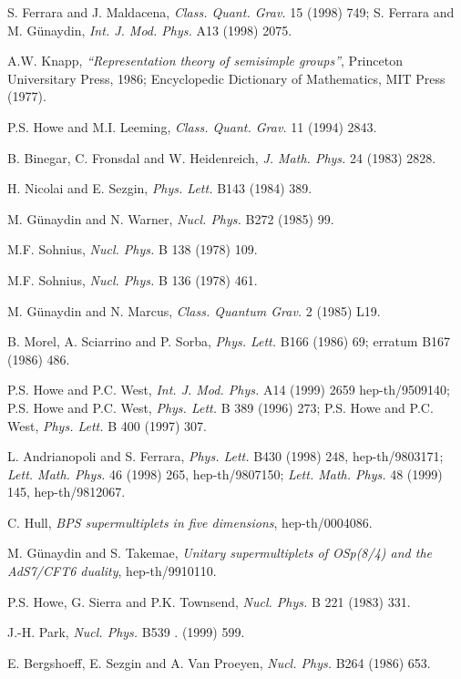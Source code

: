 \documentclass[a4paper,12pt]{article}
\begin{document}
\begin{thebibliography}{99}
 S. Ferrara and J. Maldacena, {\it Class. Quant. Grav.} 15 (1998) 749; 
S. Ferrara and M. G\"unaydin, {\it  Int. J. Mod. Phys.} A13 (1998) 
2075. 

A.W. Knapp, {\sl ``Representation theory of semisimple groups''}, 
Princeton Universitary Press, 1986; Encyclopedic Dictionary of 
Mathematics, MIT Press (1977). 

 P.S. Howe and M.I. Leeming, {\it Class. Quant. Grav.} 
11 (1994) 2843. 
  
 B. Binegar, C. Fronsdal and W. Heidenreich, {\it J. Math. 
Phys.} 24 (1983) 2828. 

H. Nicolai and E. Sezgin, {\it  Phys. Lett.} B143 (1984) 389. 

 M. G\"unaydin and N. Warner, {\it Nucl. Phys.} B272 (1985) 99. 

 
 M.F. Sohnius, {\it Nucl. Phys.}  B 138 (1978) 109.


 M.F. Sohnius, {\it Nucl. Phys.}  B 136 (1978) 461.


M. G\"unaydin and N. Marcus, {\it Class. Quantum Grav.} 2 (1985) 
L19. 


B. Morel, A. Sciarrino and P. Sorba, {\it Phys. Lett.} B166 (1986) 
69; erratum B167 (1986) 486. 


 P.S. Howe and P.C. West, {\it  Int. J. Mod. Phys.} A14 (1999) 2659
hep-th/9509140; P.S. Howe and P.C. West, {\it Phys. Lett.} B 389 
(1996) 273; P.S. Howe and P.C. West, {\it Phys. Lett.} B 400 
(1997) 307. 


 L. Andrianopoli and S. Ferrara, 
{\it Phys. Lett.} B430 (1998) 248, hep-th/9803171; 
 {\it Lett. Math. Phys.} 46 (1998) 265, hep-th/9807150;
 {\it Lett. Math. Phys.} 48
(1999) 145, hep-th/9812067. 


 C. Hull, {\it BPS supermultiplets in five dimensions}, 
hep-th/0004086. 

 M. G\"unaydin and S. Takemae, {\it Unitary supermultiplets 
of OSp(8/4) and the AdS7/CFT6 duality}, hep-th/9910110. 

 P.S. Howe, G. Sierra and P.K. Townsend, {\it Nucl. Phys.} B 221 
(1983) 331. 

 J.-H. Park, {\it Nucl. Phys.} B539 .
(1999) 599. 

 E. Bergshoeff, E. Sezgin and A. Van Proeyen, {\it Nucl. Phys.} B264 
(1986) 653. 


\end{thebibliography}
\end{document}
